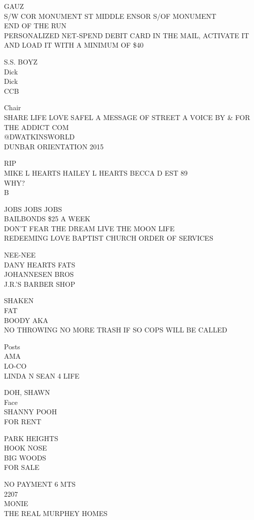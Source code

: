 \documentclass[10pt,letterpaper]{article}
\begin{document}
GAUZ\\
S/W COR MONUMENT ST MIDDLE ENSOR S/OF MONUMENT\\
END OF THE RUN\\
PERSONALIZED NET{-}SPEND DEBIT CARD IN THE MAIL, ACTIVATE IT AND LOAD IT WITH A MINIMUM OF \$40

S.S. BOYZ\\
Dick\\
Dick\\
CCB

Chair\\
SHARE LIFE LOVE SAFEL A MESSAGE OF STREET A VOICE BY \& FOR THE ADDICT COM\\
@DWATKINSWORLD\\
DUNBAR ORIENTATION 2015

RIP\\
MIKE L HEARTS HAILEY L HEARTS BECCA D EST 89\\
WHY?\\
B

JOBS JOBS JOBS\\
BAILBONDS \$25 A WEEK\\
DON'T FEAR THE DREAM LIVE THE MOON LIFE\\
REDEEMING LOVE BAPTIST CHURCH ORDER OF SERVICES

NEE{-}NEE\\
DANY HEARTS FATS\\
JOHANNESEN BROS\\
J.R.'S BARBER SHOP

SHAKEN\\
FAT\\
BOODY AKA\\
NO THROWING NO MORE TRASH IF SO COPS WILL BE CALLED

Posts\\
AMA\\
LO{-}CO\\
LINDA N SEAN 4 LIFE

DOH, SHAWN\\
Face\\
SHANNY POOH\\
FOR RENT

PARK HEIGHTS\\
HOOK NOSE\\
BIG WOODS\\
FOR SALE

NO PAYMENT 6 MTS\\
2207\\
MONIE\\
THE REAL MURPHEY HOMES
\end{document}
